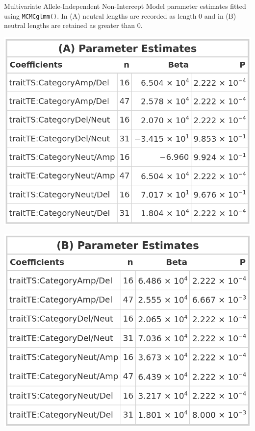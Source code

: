 \begin{table}[!htb]
    \caption[Multivariate Allele-Independent Non-Intercept Model parameter estimates fitted using \texttt{MCMCglmm()}.]{Multivariate Allele-Independent Non-Intercept Model parameter estimates fitted using \texttt{MCMCglmm()}. In (A) neutral lengths are recorded as length 0 and in (B) neutral lengths are retained as greater than 0.}
     \begin{subtable}[t]{.49\textwidth}
      \centering
      \includegraphics[width = 1\textwidth]{../tables/Chapter_5/Multivariate_MCMC_6_AI_Model.png}
    \end{subtable}%
    \hspace{0.5cm}
     \begin{subtable}[t]{.49\textwidth}
      \centering
         \includegraphics[width = 1\textwidth]{../tables/Chapter_5/Multivariate_MCMC_6_Neut_AI_Model.png}
    \end{subtable} 
\end{table}


